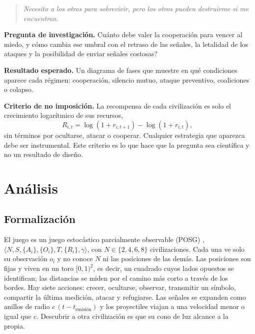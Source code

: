 \documentclass[11pt,a4paper]{article}
\begin{document}
\begin{quote}
\emph{Necesito a los otros para sobrevivir, pero los otros pueden destruirme si me encuentran.}
\end{quote}

\textbf{Pregunta de investigaci\'on.} \textquestiondown Cu\'anto debe valer la cooperaci\'on para vencer al miedo, y c\'omo cambia ese umbral con el retraso de las se\~nales, la letalidad de los ataques y la posibilidad de enviar se\~nales costosas?

\textbf{Resultado esperado.} Un diagrama de fases que muestre en qu\'e condiciones aparece cada r\'egimen: cooperaci\'on, silencio mutuo, ataque preventivo, coaliciones o colapso.

\textbf{Criterio de no imposici\'on.} La recompensa de cada civilizaci\'on es solo el crecimiento logar\'itmico de sus recursos,
\begin{equation}
R_{i,t}=\log(1+r_{i,t+1})-\log(1+r_{i,t}),
\end{equation}
sin t\'erminos por ocultarse, atacar o cooperar. Cualquier estrategia que aparezca debe ser instrumental. Este criterio es lo que hace que la pregunta sea cient\'ifica y no un resultado de dise\~no.

\section{An\'alisis}

\subsection{Formalizaci\'on}

El juego es un juego estoc\'astico parcialmente observable (POSG) \cite{hansen2004}, $\langle N, S, \{A_i\}, \{O_i\}, T, \{R_i\}, \gamma\rangle$, con $N\in\{2,4,6,8\}$ civilizaciones. Cada una ve solo su observaci\'on $o_i$ y no conoce $N$ ni las posiciones de las dem\'as. Las posiciones son fijas y viven en un toro $[0,1)^2$, es decir, un cuadrado cuyos lados opuestos se identifican; las distancias se miden por el camino m\'as corto a trav\'es de los bordes. Hay siete acciones: crecer, ocultarse, observar, transmitir un s\'imbolo, compartir la \'ultima medici\'on, atacar y refugiarse. Las se\~nales se expanden como anillos de radio $c\,(t-t_{\text{emisi\'on}})$ y los proyectiles viajan a una velocidad menor o igual que $c$. Descubrir a otra civilizaci\'on es que su cono de luz alcance a la propia.
\end{document}
